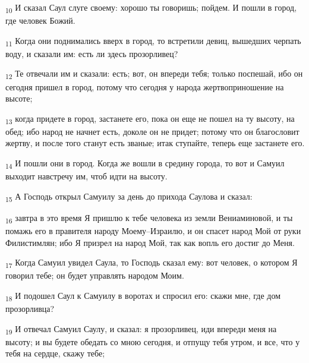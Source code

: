 \begin{tcolorbox}
\textsubscript{10} И сказал Саул слуге своему: хорошо ты говоришь; пойдем. И пошли в город, где человек Божий.
\end{tcolorbox}
\begin{tcolorbox}
\textsubscript{11} Когда они поднимались вверх в город, то встретили девиц, вышедших черпать воду, и сказали им: есть ли здесь прозорливец?
\end{tcolorbox}
\begin{tcolorbox}
\textsubscript{12} Те отвечали им и сказали: есть; вот, он впереди тебя; только поспешай, ибо он сегодня пришел в город, потому что сегодня у народа жертвоприношение на высоте;
\end{tcolorbox}
\begin{tcolorbox}
\textsubscript{13} когда придете в город, застанете его, пока он еще не пошел на ту высоту, на обед; ибо народ не начнет есть, доколе он не придет; потому что он благословит жертву, и после того станут есть званые; итак ступайте, теперь еще застанете его.
\end{tcolorbox}
\begin{tcolorbox}
\textsubscript{14} И пошли они в город. Когда же вошли в средину города, то вот и Самуил выходит навстречу им, чтоб идти на высоту.
\end{tcolorbox}
\begin{tcolorbox}
\textsubscript{15} А Господь открыл Самуилу за день до прихода Саулова и сказал:
\end{tcolorbox}
\begin{tcolorbox}
\textsubscript{16} завтра в это время Я пришлю к тебе человека из земли Вениаминовой, и ты помажь его в правителя народу Моему--Израилю, и он спасет народ Мой от руки Филистимлян; ибо Я призрел на народ Мой, так как вопль его достиг до Меня.
\end{tcolorbox}
\begin{tcolorbox}
\textsubscript{17} Когда Самуил увидел Саула, то Господь сказал ему: вот человек, о котором Я говорил тебе; он будет управлять народом Моим.
\end{tcolorbox}
\begin{tcolorbox}
\textsubscript{18} И подошел Саул к Самуилу в воротах и спросил его: скажи мне, где дом прозорливца?
\end{tcolorbox}
\begin{tcolorbox}
\textsubscript{19} И отвечал Самуил Саулу, и сказал: я прозорливец, иди впереди меня на высоту; и вы будете обедать со мною сегодня, и отпущу тебя утром, и все, что у тебя на сердце, скажу тебе;
\end{tcolorbox}
